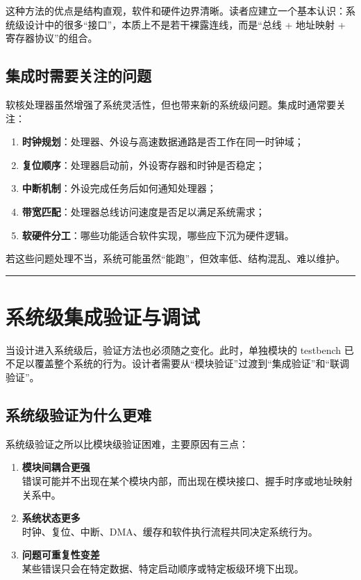 这种方法的优点是结构直观，软件和硬件边界清晰。读者应建立一个基本认识：系统级设计中的很多``接口''，本质上不是若干裸露连线，而是``总线
+ 地址映射 + 寄存器协议''的组合。

\subsection{集成时需要关注的问题}\label{ux96c6ux6210ux65f6ux9700ux8981ux5173ux6ce8ux7684ux95eeux9898}

软核处理器虽然增强了系统灵活性，但也带来新的系统级问题。集成时通常要关注：

\begin{enumerate}
\def\labelenumi{\arabic{enumi}.}
\tightlist
\item
  \textbf{时钟规划}：处理器、外设与高速数据通路是否工作在同一时钟域；
\item
  \textbf{复位顺序}：处理器启动前，外设寄存器和时钟是否稳定；
\item
  \textbf{中断机制}：外设完成任务后如何通知处理器；
\item
  \textbf{带宽匹配}：处理器总线访问速度是否足以满足系统需求；
\item
  \textbf{软硬件分工}：哪些功能适合软件实现，哪些应下沉为硬件逻辑。
\end{enumerate}

若这些问题处理不当，系统可能虽然``能跑''，但效率低、结构混乱、难以维护。

\begin{center}\rule{0.5\linewidth}{0.5pt}\end{center}

\section{系统级集成验证与调试}\label{ux7cfbux7edfux7ea7ux96c6ux6210ux9a8cux8bc1ux4e0eux8c03ux8bd5}

当设计进入系统级后，验证方法也必须随之变化。此时，单独模块的 testbench
已不足以覆盖整个系统的行为。设计者需要从``模块验证''过渡到``集成验证''和``联调验证''。

\subsection{系统级验证为什么更难}\label{ux7cfbux7edfux7ea7ux9a8cux8bc1ux4e3aux4ec0ux4e48ux66f4ux96be}

系统级验证之所以比模块级验证困难，主要原因有三点：

\begin{enumerate}
\def\labelenumi{\arabic{enumi}.}
\item
  \textbf{模块间耦合更强}\\
  错误可能并不出现在某个模块内部，而出现在模块接口、握手时序或地址映射关系中。
\item
  \textbf{系统状态更多}\\
  时钟、复位、中断、DMA、缓存和软件执行流程共同决定系统行为。
\item
  \textbf{问题可重复性变差}\\
  某些错误只会在特定数据、特定启动顺序或特定板级环境下出现。
\end{enumerate}

